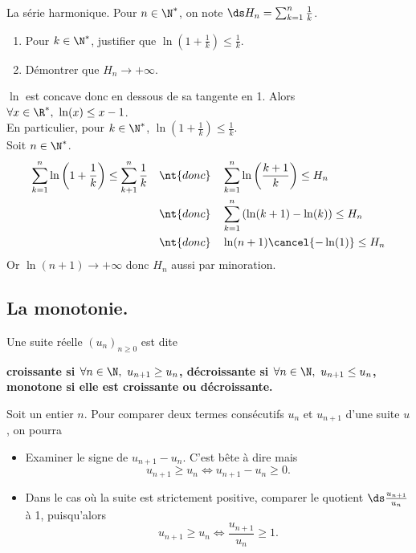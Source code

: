 \documentclass[11pt]{article}
\begin{document}
\begin{ex}{La série harmonique.}{}
    Pour $n\in\N^*$, on note $\ds H_n=\sum_{k=1}^n\frac{1}{k}$.
    \begin{enumerate}
        \item Pour $k\in\N^*$, justifier que $\ln(1+\frac{1}{k})\leq\frac{1}{k}$.
        \item Démontrer que $H_n\to+\infty$.
    \end{enumerate}
    \tcblower
     $\ln$ est concave donc en dessous de sa tangente en 1. Alors $\forall x \in \R^*, ~ \ln(x)\leq x-1$.\\
    En particulier, pour $k\in\N^*$, $\ln(1+\frac{1}{k})\leq\frac{1}{k}$.\\
     Soit $n\in\N^*$.
    \begin{align*}
        \sum_{k=1}^n\ln\left(1+\frac{1}{k}\right)\leq\sum_{k+1}^n\frac{1}{k} \quad&\nt{donc}\quad\sum_{k=1}^n\ln\left( \frac{k+1}{k} \right) \leq H_n\\
        &\nt{donc}\quad\sum_{k=1}^n\left( \ln(k+1) - \ln(k) \right) \leq H_n\\
        &\nt{donc}\quad\ln(n+1)\cancel{-\ln(1)}\leq H_n
    \end{align*}
    Or $\ln(n+1)\to+\infty$ donc $H_n$ aussi par minoration.
\end{ex}

\subsection{La monotonie.}

\begin{defi}{}{}
    Une suite réelle $(u_n)_{n\geq0}$ est dite
    \begin{center}
        \bf{croissante} si $\forall n\in\N, ~ u_{n+1}\geq u_n$, \qquad \bf{décroissante} si $\forall n \in \N, ~ u_{n+1}\leq u_n$,\\
        \bf{monotone} si elle est croissante ou décroissante.
    \end{center}
\end{defi}

\begin{meth}{}{}
    Soit un entier $n$. Pour comparer deux termes consécutifs $u_n$ et $u_{n+1}$ d'une suite $u$, on pourra
    \begin{itemize}
        \item Examiner le signe de $u_{n+1}-u_n$. C'est bête à dire mais
        \begin{equation*}
            u_{n+1} \geq u_n \iff u_{n+1} - u_n \geq 0.
        \end{equation*}
        \item Dans le cas où la suite est strictement positive, comparer le quotient $\ds\frac{u_{n+1}}{u_n}$ à 1, puisqu'alors
        \begin{equation*}
            u_{n+1} \geq u_n \iff \frac{u_{n+1}}{u_n} \geq 1.
        \end{equation*}
    \end{itemize}
\end{meth}
\end{document}
